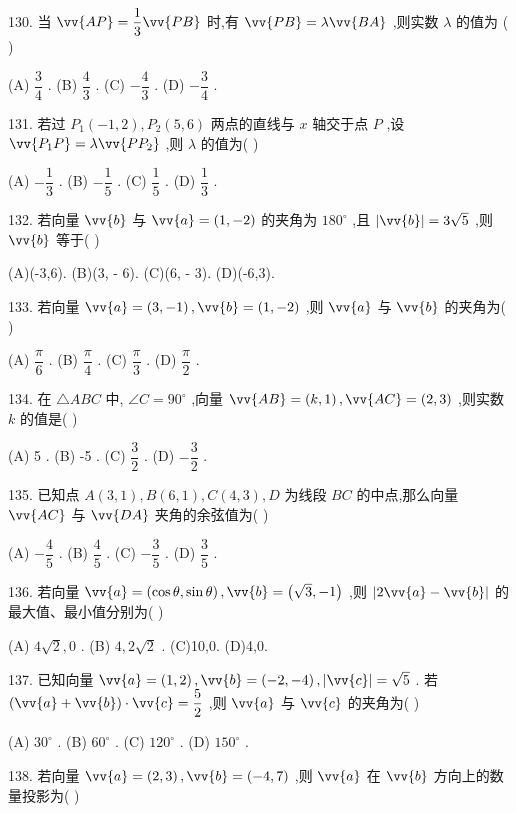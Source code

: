 130. 当 $\vv{AP} = \dfrac{1}{3}\vv{PB}$ 时,有 $\vv{PB} = \lambda \vv{BA}$ ,则实数 $\lambda$ 的值为 (   )

(A) $\dfrac{3}{4}$ . (B) $\dfrac{4}{3}$ . (C) $- \dfrac{4}{3}$ . (D) $- \dfrac{3}{4}$ .

131. 若过 ${P}_{1}\left( {-1,2}\right) ,{P}_{2}\left( {5,6}\right)$ 两点的直线与 $x$ 轴交于点 $P$ ,设 $\vv{{P}_{1}P} = \lambda \vv{P{P}_{2}}$ ,则 $\lambda$ 的值为(   )

(A) $- \dfrac{1}{3}$ . (B) $- \dfrac{1}{5}$ . (C) $\dfrac{1}{5}$ . (D) $\dfrac{1}{3}$ .

132. 若向量 $\vv{b}$ 与 $\vv{a} = \left( {1, - 2}\right)$ 的夹角为 ${180}^{ \circ  }$ ,且 $\left| \vv{b}\right|  = 3\sqrt{5}$ ,则 $\vv{b}$ 等于(   )

(A)(-3,6). (B)(3, - 6). (C)(6, - 3). (D)(-6,3).

133. 若向量 $\vv{a} = \left( {3, - 1}\right) ,\vv{b} = \left( {1, - 2}\right)$ ,则 $\vv{a}$ 与 $\vv{b}$ 的夹角为(   )

(A) $\dfrac{\pi }{6}$ . (B) $\dfrac{\pi }{4}$ . (C) $\dfrac{\pi }{3}$ . (D) $\dfrac{\pi }{2}$ .

134. 在 $\bigtriangleup {ABC}$ 中, $\angle C = {90}^{ \circ  }$ ,向量 $\vv{AB} = \left( {k,1}\right) ,\vv{AC} = \left( {2,3}\right)$ ,则实数 $k$ 的值是(   )

(A) 5 . (B) -5 . (C) $\dfrac{3}{2}$ . (D) $- \dfrac{3}{2}$ .

135. 已知点 $A\left( {3,1}\right) ,B\left( {6,1}\right) ,C\left( {4,3}\right) ,D$ 为线段 ${BC}$ 的中点,那么向量 $\vv{AC}$ 与 $\vv{DA}$ 夹角的余弦值为(   )

(A) $- \dfrac{4}{5}$ . (B) $\dfrac{4}{5}$ . (C) $- \dfrac{3}{5}$ . (D) $\dfrac{3}{5}$ .

136. 若向量 $\vv{a} = \left( {\cos \theta ,\sin \theta }\right) ,\vv{b} = \left( {\sqrt{3}, - 1}\right)$ ,则 $\left| {2\vv{a} - \vv{b}}\right|$ 的最大值、最小值分别为(   )

(A) $4\sqrt{2},0$ . (B) $4,2\sqrt{2}$ . (C)10,0. (D)4,0.

137. 已知向量 $\vv{a} = \left( {1,2}\right) ,\vv{b} = \left( {-2, - 4}\right) ,\left| \vv{c}\right|  = \sqrt{5}$ . 若 $\left( {\vv{a} + \vv{b}}\right)  \cdot  \vv{c} = \dfrac{5}{2}$ ,则 $\vv{a}$ 与 $\vv{c}$ 的夹角为(   )

(A) ${30}^{ \circ  }$ . (B) ${60}^{ \circ  }$ . (C) ${120}^{ \circ  }$ . (D) ${150}^{ \circ  }$ .

138. 若向量 $\vv{a} = \left( {2,3}\right) ,\vv{b} = \left( {-4,7}\right)$ ,则 $\vv{a}$ 在 $\vv{b}$ 方向上的数量投影为(   )


